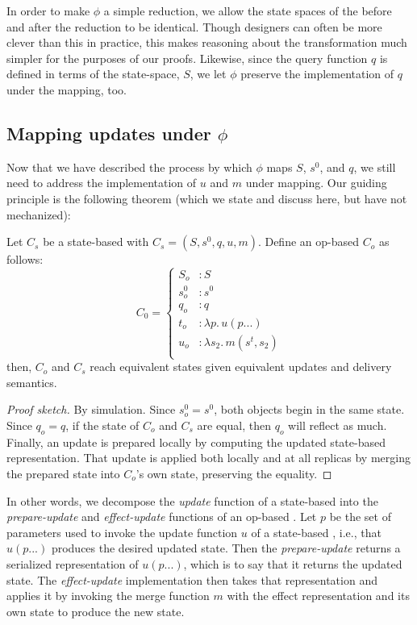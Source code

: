 In order to make $\phi$ a simple reduction, we allow the state spaces of the
\CRDT before and after the reduction to be identical. Though \CRDT designers can
often be more clever than this in practice, this makes reasoning about the
transformation much simpler for the purposes of our proofs. Likewise, since the
query function $q$ is defined in terms of the state-space, $S$, we let $\phi$
preserve the implementation of $q$ under the mapping, too.

\subsection{Mapping updates under $\phi$}
\label{sec:states-under-phi}
Now that we have described the process by which $\phi$ maps $S$, $s^0$, and $q$,
we still need to address the implementation of $u$ and $m$ under mapping. Our
guiding principle is the following theorem (which we state and discuss here, but
have not mechanized):
\begin{theorem}
  Let $C_s$ be a state-based \CRDT with $C_s = (S, s^0, q, u, m)$. Define an
  op-based \CRDT $C_o$ as follows:
  \[
    C_0 = \left\{ \begin{aligned}
      S_o &: S \\
      s^0_o &: s^0 \\
      q_o &: q \\
      t_o &: \lambda p.\, u(p...) \\
      u_o &: \lambda s_2.\, m(s^t, s_2) \\
    \end{aligned} \right.
  \]
  then, $C_o$ and $C_s$ reach equivalent states given equivalent updates and
  delivery semantics.
\end{theorem}
\begin{proof}[Proof sketch]
By simulation. Since $s^0_o = s^0$, both objects begin in the same state. Since
$q_o = q$, if the state of $C_o$ and $C_s$ are equal, then $q_o$ will reflect as
much. Finally, an update is prepared locally by computing the updated
state-based representation. That update is applied both locally and at all
replicas by merging the prepared state into $C_o$'s own state, preserving the
equality.
\end{proof}

In other words, we decompose the \textit{update} function of a state-based \CRDT
into the \textit{prepare-update} and \textit{effect-update} functions of an
op-based \CRDT. Let $p$ be the set of parameters used to invoke the update
function $u$ of a state-based \CRDT, i.e., that $u(p...)$ produces the desired
updated state. Then the \textit{prepare-update} returns a serialized
representation of $u(p...)$, which is to say that it returns the updated state.
The \textit{effect-update} implementation then takes that representation and
applies it by invoking the merge function $m$ with the effect representation and
its own state to produce the new state.

